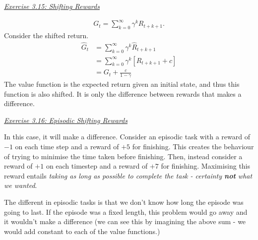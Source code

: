 \documentclass{article}
\newcommand{\myq}[1]{%
	\vspace{1em}
	\noindent\underline{\emph{Exercise #1}}\vspace{0.25em}\linebreak
}
\begin{document}
\myq{3.15: Shifting Rewards}
\begin{align}
G_t = \sum_{k=0}^{\infty} \gamma^k R_{t+k+1}.
\end{align}
Consider the shifted return.
\begin{align}
\hat{G}_t &= \sum_{k=0}^{\infty} \gamma^k \hat{R}_{t+k+1} \nonumber \\
&=\sum_{k=0}^{\infty} \gamma^k [R_{t+k+1} + c] \nonumber \\
&= G_t + \frac{c}{1 - \gamma}
\end{align}
The value function is the expected return given an initial state, and thus this function is also shifted. It is only the difference between rewards that makes a difference. 

\myq{3.16: Episodic Shifting Rewards}
In this case, it will make a difference. Consider an episodic task with a reward of $-1$ on each time step and a reward of $+5$ for finishing. This creates the behaviour of trying to minimise the time taken before finishing. Then, instead consider a reward of $+1$ on each timestep and a reward of $+7$ for finishing. Maximising this reward entails \emph{taking as long as possible to complete the task - certainty \textbf{not} what we wanted}. 

The different in episodic tasks is that we don't know how long the episode was going to last. If the episode was a fixed length, this problem would go away and it wouldn't make a difference (we can see this by imagining the above sum - we would add constant to each of the value functions.)
\end{document}
